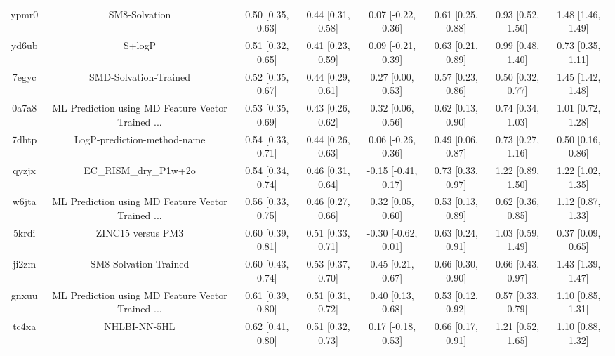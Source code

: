 \documentclass{article}
\begin{document}
\begin{center}
\begin{longtable}{|cccccccc|}
 ypmr0 &                                      SM8-Solvation &  0.50 [0.35, 0.63] &  0.44 [0.31, 0.58] &    0.07 [-0.22, 0.36] &  0.61 [0.25, 0.88] &    0.93 [0.52, 1.50] &     1.48 [1.46, 1.49] \\
 yd6ub &                                             S+logP &  0.51 [0.32, 0.65] &  0.41 [0.23, 0.59] &    0.09 [-0.21, 0.39] &  0.63 [0.21, 0.89] &    0.99 [0.48, 1.40] &     0.73 [0.35, 1.11] \\
 7egyc &                              SMD-Solvation-Trained &  0.52 [0.35, 0.67] &  0.44 [0.29, 0.61] &     0.27 [0.00, 0.53] &  0.57 [0.23, 0.86] &    0.50 [0.32, 0.77] &     1.45 [1.42, 1.48] \\
 0a7a8 &  ML Prediction using MD Feature Vector Trained ... &  0.53 [0.35, 0.69] &  0.43 [0.26, 0.62] &     0.32 [0.06, 0.56] &  0.62 [0.13, 0.90] &    0.74 [0.34, 1.03] &     1.01 [0.72, 1.28] \\
 7dhtp &                        LogP-prediction-method-name &  0.54 [0.33, 0.71] &  0.44 [0.26, 0.63] &    0.06 [-0.26, 0.36] &  0.49 [0.06, 0.87] &    0.73 [0.27, 1.16] &     0.50 [0.16, 0.86] \\
 qyzjx &                              EC\_RISM\_dry\_P1w+2o &  0.54 [0.34, 0.74] &  0.46 [0.31, 0.64] &   -0.15 [-0.41, 0.17] &  0.73 [0.33, 0.97] &    1.22 [0.89, 1.50] &     1.22 [1.02, 1.35] \\
 w6jta &  ML Prediction using MD Feature Vector Trained ... &  0.56 [0.33, 0.75] &  0.46 [0.27, 0.66] &     0.32 [0.05, 0.60] &  0.53 [0.13, 0.89] &    0.62 [0.36, 0.85] &     1.12 [0.87, 1.33] \\
 5krdi &                                  ZINC15 versus PM3 &  0.60 [0.39, 0.81] &  0.51 [0.33, 0.71] &   -0.30 [-0.62, 0.01] &  0.63 [0.24, 0.91] &    1.03 [0.59, 1.49] &     0.37 [0.09, 0.65] \\
 ji2zm &                              SM8-Solvation-Trained &  0.60 [0.43, 0.74] &  0.53 [0.37, 0.70] &     0.45 [0.21, 0.67] &  0.66 [0.30, 0.90] &    0.66 [0.43, 0.97] &     1.43 [1.39, 1.47] \\
 gnxuu &  ML Prediction using MD Feature Vector Trained ... &  0.61 [0.39, 0.80] &  0.51 [0.31, 0.72] &     0.40 [0.13, 0.68] &  0.53 [0.12, 0.92] &    0.57 [0.33, 0.79] &     1.10 [0.85, 1.31] \\
 tc4xa &                                       NHLBI-NN-5HL &  0.62 [0.41, 0.80] &  0.51 [0.32, 0.73] &    0.17 [-0.18, 0.53] &  0.66 [0.17, 0.91] &    1.21 [0.52, 1.65] &     1.10 [0.88, 1.32] \\

\end{longtable}
\end{center}
\end{document}
